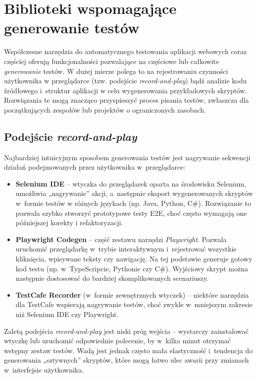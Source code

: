 \documentclass[12pt]{report}
\begin{document}

\section{Biblioteki wspomagające generowanie testów}
\label{sec:biblioteki-generujace}
Współczesne narzędzia do automatycznego testowania aplikacji webowych coraz częściej oferują funkcjonalności pozwalające na częściowe lub całkowite \textit{generowanie} testów. W dużej mierze polega to na rejestrowaniu czynności użytkownika w przeglądarce (tzw. podejście \emph{record-and-play}) bądź analizie kodu źródłowego i~struktur aplikacji w celu wygenerowania przykładowych skryptów. Rozwiązania te mogą znacząco przyspieszyć proces pisania testów, zwłaszcza dla początkujących zespołów lub projektów o ograniczonych zasobach.

\subsection*{Podejście \emph{record-and-play}}
Najbardziej intuicyjnym sposobem generowania testów jest nagrywanie sekwencji działań podejmowanych przez użytkownika w~przeglądarce:
\begin{itemize}
    \item \textbf{Selenium IDE} – wtyczka do przeglądarek oparta na środowisku Selenium, umożliwia „nagrywanie” akcji, a~następnie eksport wygenerowanych skryptów w~formie testów w różnych językach (np. Java, Python, C\#). Rozwiązanie to pozwala szybko stworzyć prototypowe testy E2E, choć często wymagają one późniejszej korekty i refaktoryzacji.
    \item \textbf{Playwright Codegen} – część zestawu narzędzi \emph{Playwright}. Pozwala uruchomić przeglądarkę w~trybie interaktywnym i~rejestrować wszystkie kliknięcia, wpisywane teksty czy nawigację. Na tej podstawie generuje gotowy kod testu (np. w~TypeScripcie, Pythonie czy C\#). Wyjściowy skrypt można następnie dostosować do bardziej skomplikowanych scenariuszy.
    \item \textbf{TestCafe Recorder} (w~formie zewnętrznych wtyczek) – niektóre narzędzia dla TestCafe wspierają nagrywanie testów, choć zwykle w~mniejszym zakresie niż Selenium IDE czy Playwright.
\end{itemize}
Zaletą podejścia \emph{record-and-play} jest niski próg wejścia – wystarczy zainstalować wtyczkę lub uruchomić odpowiednie polecenie, by w~kilka minut otrzymać wstępny zestaw testów. Wadą jest jednak często mała elastyczność i~tendencja do generowania „sztywnych” skryptów, które mogą łatwo ulec awarii przy zmianach w~interfejsie użytkownika.
\end{document}
